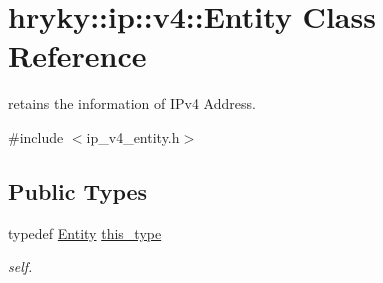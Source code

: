 \hypertarget{classhryky_1_1ip_1_1v4_1_1_entity}{\section{hryky\-:\-:ip\-:\-:v4\-:\-:Entity Class Reference}
\label{classhryky_1_1ip_1_1v4_1_1_entity}
}


retains the information of I\-Pv4 Address.  




{\ttfamily \#include $<$ip\-\_\-v4\-\_\-entity.\-h$>$}

\subsection*{Public Types}
\begin{DoxyCompactItemize}
\item 
\hypertarget{classhryky_1_1ip_1_1v4_1_1_entity_a0ac5c55710070f7c540a5243bcfa8836}{typedef \hyperlink{classhryky_1_1ip_1_1v4_1_1_entity}{Entity} \hyperlink{classhryky_1_1ip_1_1v4_1_1_entity_a0ac5c55710070f7c540a5243bcfa8836}{this\-\_\-type}}\label{classhryky_1_1ip_1_1v4_1_1_entity_a0ac5c55710070f7c540a5243bcfa8836}

\begin{DoxyCompactList}\small\item\em self. \end{DoxyCompactList}\end{DoxyCompactItemize}
